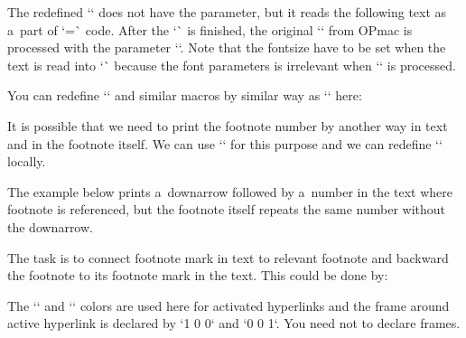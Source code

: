 {The redefined `\fnote` does not have the parameter, but it reads the following text as a~part of `=\hbox` code. After the `\hbox` is finished, the original `\fnote` from OPmac is processed with the parameter ``. Note that the fontsize have to be set when the text is read into `\hbox` because the font parameters is irrelevant when `` is processed. 



You can redefine `\mnote` and similar macros by similar way as `\fnote` here: 

\begtt
\expandafter\def\expandafter\amnote\expandafter{\mnote{\unhbox0}} 
\def\mnote{\setbox0=\hbox\bgroup\aftergroup\amnote\let\next} 
\endtt

 


It is possible that we need to print the footnote number by another way in text and in the footnote itself. We can use `\fnotehook` for this purpose and we can redefine `\thefnote` locally. 



The example below prints a~downarrow followed by a~number in the text where footnote is referenced, but the footnote itself repeats the same number without the downarrow. 

\begtt
\def\thefnote{$\,\downarrow^{\locfnum}$} 
\def\fnotehook{\def\thefnote{\locfnum}} 
\endtt

 


The task is to connect footnote mark in text to relevant footnote and backward the footnote to its footnote mark in the text. This could be done by: 

\begtt
\hyperlinks\Green\Green 
 
\let\fnmarkboth=\fnmarkx 
 
\def\fnmarkx{\link[fnx:\the\fnotenum]{\localcolor\Red} {\fnmarkboth}%
             \dest[fny:\the\fnotenum]} 
\def\fnmarky{\link[fny:\the\fnotenum]{\localcolor\Blue}{\fnmarkboth}%
             \dest[fnx:\the\fnotenum]} 
 
\def\fnote{\fnoteG\fnmarky} 
\def\fnotemark#1{{\advance\fnotenum by#1\relax \fnmarky}} 
 
\def\fnxborder{1 0 0} 
\def\fnyborder{0 0 1} 
\endtt


The `\Red` and `\Bue` colors are used here for activated hyperlinks  and the frame around active hyperlink is declared by `\fnxborder` and `\fnyborder`. You need not to declare frames. 


}
